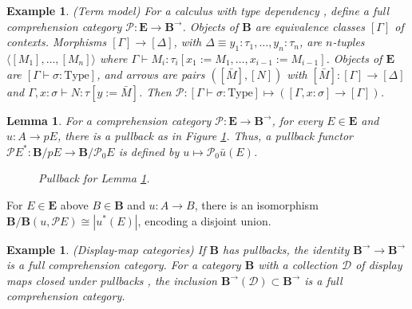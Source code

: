 \documentclass{article}
\theoremstyle{plain}
\newtheorem{lemma}[theorem]{Lemma}
\newtheorem{example}[theorem]{Example}
\theoremstyle{remark}
\begin{document}
\begin{example}
\label{ex:4.3}
(Term model) For a calculus with type dependency \cite{MartinLof1984, Troelstra1986}, define a full comprehension category $\mathscr{P} : \mathbf{E} \to \mathbf{B}^{\to}$. Objects of $\mathbf{B}$ are equivalence classes $[\Gamma]$ of contexts. Morphisms $[\Gamma] \to [\Delta]$, with $\Delta \equiv y_1 : \tau_1, \ldots, y_n : \tau_n$, are $n$-tuples $\langle [M_1], \ldots, [M_n] \rangle$ where $\Gamma \vdash M_i : \tau_i[x_1 := M_1, \ldots, x_{i-1} := M_{i-1}]$. Objects of $\mathbf{E}$ are $[\Gamma \vdash \sigma : \text{Type}]$, and arrows are pairs $([\bar{M}], [N])$ with $[\bar{M}] : [\Gamma] \to [\Delta]$ and $\Gamma, x : \sigma \vdash N : \tau[\hat{y} := \bar{M}]$. Then $\mathscr{P} : [\Gamma \vdash \sigma : \text{Type}] \mapsto ([\Gamma, x : \sigma] \to [\Gamma])$.
\end{example}

\begin{lemma}
\label{lem:4.4}
For a comprehension category $\mathscr{P} : \mathbf{E} \to \mathbf{B}^{\to}$, for every $E \in \mathbf{E}$ and $u : A \to p E$, there is a pullback as in Figure \ref{fig:pullback-4.4}. Thus, a pullback functor $\mathscr{P} E^* : \mathbf{B}/p E \to \mathbf{B}/\mathscr{P}_0 E$ is defined by $u \mapsto \mathscr{P}_0 \bar{u}(E)$.
\begin{figure}[h]
    \centering
    \caption{Pullback for Lemma \ref{lem:4.4}.}
    \label{fig:pullback-4.4}
\end{figure}
\end{lemma}

For $E \in \mathbf{E}$ above $B \in \mathbf{B}$ and $u : A \to B$, there is an isomorphism $\mathbf{B}/\mathbf{B}(u, \mathscr{P} E) \cong |u^*(E)|$, encoding a disjoint union.

\begin{example}
\label{ex:4.5}
(Display-map categories) If $\mathbf{B}$ has pullbacks, the identity $\mathbf{B}^{\to} \to \mathbf{B}^{\to}$ is a full comprehension category. For a category $\mathbf{B}$ with a collection $\mathscr{D}$ of display maps closed under pullbacks \cite{Taylor1986, HylandPitts1989, Lamarche1988}, the inclusion $\mathbf{B}^{\to}(\mathscr{D}) \subset \mathbf{B}^{\to}$ is a full comprehension category.
\end{example}
\end{document}
